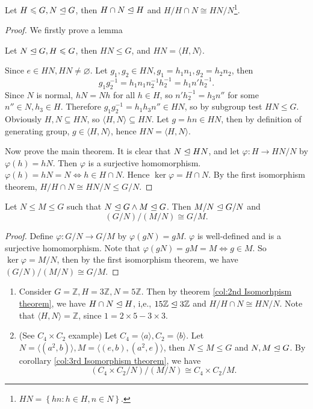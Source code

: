 \documentclass[a4paper]{article}
\begin{document}
\begin{corollary}\label{col:2nd Isomorhpism theorem}
  Let $ H\leqslant G, N \trianglelefteq G $, then $ H \cap N \trianglelefteq H $ and $
  H/H \cap N \cong HN/N $\footnote{$ HN=\left\{ hn:h\in H, n\in N\right\} $.}.
\end{corollary}
\begin{proof}
  We firstly prove a lemma
  \begin{lemma}
    Let $ N \trianglelefteq G, H\leqslant G $, then $HN\le G$, and $ HN=\langle
    H,N \rangle $.
  \end{lemma}
  Since $ e\in HN, HN\neq \varnothing $. Let $ g_1,g_2\in HN,
  g_1=h_1n_1, g_2=h_2n_2 $, then
  \[
    g_1g_2^{-1}=h_1n_1 n_2^{-1}h_2^{-1}=h_1n'h_2^{-1}
  .\]
  Since $N$ is normal, $hN=Nh$ for all $h\in H$, so $
  n'h_2^{-1}=h_3n'' $ for some $n''\in N, h_3\in H$. Therefore $
  g_1g_2^{-1}=h_1h_3n''\in HN $, so by subgroup test $ HN\le G $.
  Obviously $ H,N \subseteq HN $, so $ \langle H,N \rangle \subseteq
  HN $. Let $ g=hn\in HN $, then by definition of generating group, $
  g\in \langle H,N \rangle $, hence $ HN=\langle H,N \rangle $.

  Now prove the main theorem. It is clear that $ N \trianglelefteq HN $, and
  let $ \varphi: H\to HN/N $ by $ \varphi(h)=hN $. Then $ \varphi $
  is a surjective homomorphism. $ \varphi(h)=hN=N \Leftrightarrow
  h\in H\cap N $. Hence $ \ker \varphi=H \cap N $. By the first
  isomorphism theorem, $ H/H\cap N \cong HN/N \le G/N $.
\end{proof}
\begin{corollary}\label{col:3rd Isomorphism theorem}
  Let $ N \le M \le G $ such that $ N \trianglelefteq G \land M \trianglelefteq G
  $. Then $ M /N \trianglelefteq G/N $ and
  \[
    (G/N)/(M/N) \cong G/M
  .\]
\end{corollary}
\begin{proof}
  Define $ \varphi:G/N \to G/M $ by $ \varphi(gN)=gM $. $ \varphi $
  is well-defined and is a surjective homomorphism. Note that $
  \varphi(gN)=gM=M \Leftrightarrow g\in M $. So $ \ker \varphi=M/N $,
  then by the first isomorphism theorem, we have $ (G/N)/(M/N) \cong G/M $.
\end{proof}
\begin{example}
  \begin{enumerate}
    \item Consider $ G= \mathbb{Z} ,H=3\mathbb{Z}, N=5\mathbb{Z} $.
      Then by theorem \ref{col:2nd Isomorhpism theorem}, we have $ H
      \cap N \trianglelefteq H $, i,e., $ 15\mathbb{Z} \trianglelefteq 3\mathbb{Z}
      $ and $ H/H\cap N \cong HN/N $. Note that $ \langle H,N \rangle
      =\mathbb{Z} $, since $1=2\times 5-3\times 3$.
    \item (See $ C_4 \times C_2 $ example) Let $ C_4=\langle a
      \rangle , C_2=\langle b \rangle $. Let $ N=\langle (a^2,b)
      \rangle, M=\langle (e,b),(a^2,e) \rangle $, then $ N \le M\le G
      $ and $ N,M \trianglelefteq G $. By corollary \ref{col:3rd Isomorphism
      theorem}, we have
      \[
        (C_4 \times C_2 / N)/ (M/N)\cong C_4 \times C_2 / M
      .\]
  \end{enumerate}
\end{example}
\end{document}
